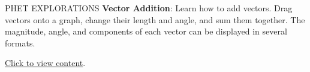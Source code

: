 \documentclass[../../main-ap-physics.tex]{subfiles}
\begin{document}
\begin{center}
    \captionsetup{type=figure,margin=1in,font=scriptsize}
    \label{g2pI0f}
\end{center}

\begin{gradient}{PHET EXPLORATIONS}
    \textbf{Vector Addition}: Learn how to add vectors. Drag vectors onto a graph, change their length and angle, and sum them together. The magnitude, angle, and components of each vector can be displayed in several formats.

    \vspace{1em}

    \href{https://phet.colorado.edu/sims/html/vector-addition/latest/vector-addition_all.html}{Click to view content}.
\end{gradient}
\end{document}
